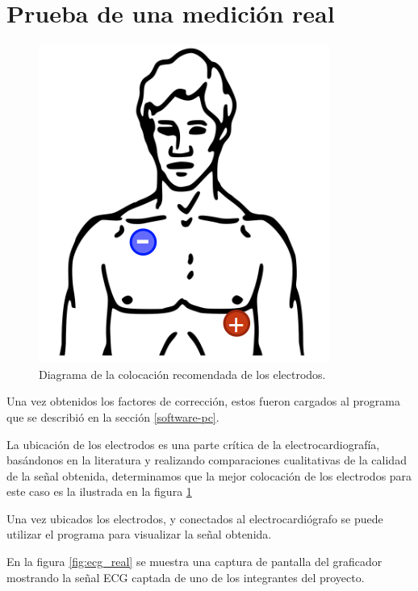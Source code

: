\documentclass[conference]{IEEEtran}
\begin{document}
\section{Prueba de una medición real}


\begin{figure}[t]
    \centering
    \includegraphics[width=0.5\linewidth]{figs/ubiacion_electrodos.png}
    \caption{Diagrama de la colocación recomendada de los electrodos.}
    \label{fig:ubicacion_electrodos}

\end{figure}
Una vez obtenidos los factores de corrección, estos fueron cargados al programa
que se describió en la sección \ref{software-pc}.

La ubicación de los electrodos es una parte crítica de la electrocardiografía,
basándonos en la literatura y realizando comparaciones cualitativas de la calidad
de la señal obtenida, determinamos que la mejor colocación de los electrodos para
este caso es la ilustrada en la figura \ref{fig:ubicacion_electrodos}

Una vez ubicados los electrodos, y conectados al electrocardiógrafo se puede utilizar
el programa para visualizar la señal obtenida.

En la figura \ref{fig:ecg_real} se muestra una captura de pantalla del graficador
mostrando la señal ECG captada de uno de los integrantes del proyecto.
\end{document}
